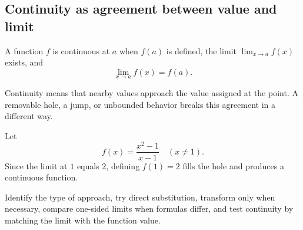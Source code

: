 \subsection{Continuity as agreement between value and limit}

\begin{definitionbox}
A function $f$ is continuous at $a$ when $f(a)$ is defined, the limit $\lim_{x\to a}f(x)$ exists, and
\[
\lim_{x\to a}f(x)=f(a).
\]
\end{definitionbox}

\begin{interpretationbox}
Continuity means that nearby values approach the value assigned at the point. A removable hole, a jump, or unbounded behavior breaks this agreement in a different way.
\end{interpretationbox}

\begin{examplebox}
Let
\[
f(x)=\frac{x^2-1}{x-1}\quad(x\ne1).
\]
Since the limit at $1$ equals $2$, defining $f(1)=2$ fills the hole and produces a continuous function.
\end{examplebox}

\begin{summarybox}
Identify the type of approach, try direct substitution, transform only when necessary, compare one-sided limits when formulas differ, and test continuity by matching the limit with the function value.
\end{summarybox}
